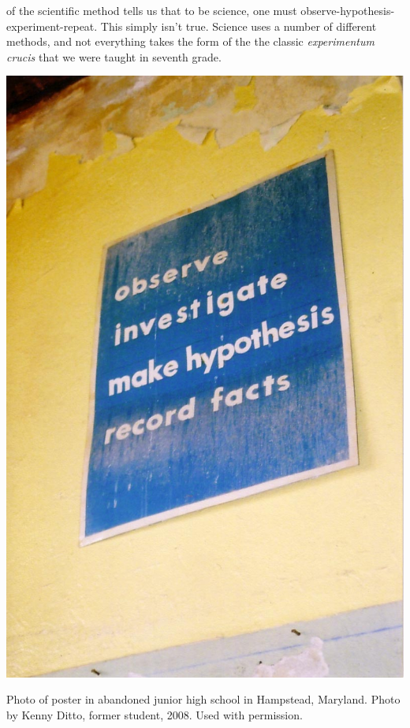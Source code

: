 \begin{refsection}
 of the scientific method tells us that to be science, one must observe-hypothesis-experiment-repeat. This simply isn’t true. Science uses a number of different methods, and not everything takes the form of the the classic \emph{experimentum crucis} that we were taught in seventh grade.
\begin{marginfigure}
 \begin{center}
     \includegraphics[scale=0.75]{../images/observe_poster.jpg}
\end{center}
 \caption{Photo of poster in abandoned junior high school in Hampstead, Maryland. Photo by Kenny Ditto, former student, 2008. Used with permission.}
\label{fig: scientificmethod}
\end{marginfigure}



\end{refsection}
